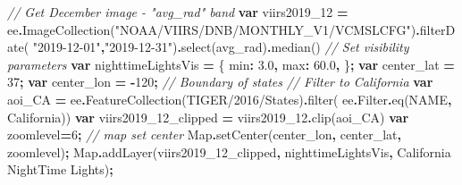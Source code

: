 \documentclass[
]{article}
\newenvironment{Shaded}{\begin{snugshade}}{\end{snugshade}}
\newcommand{\AttributeTok}[1]{\textcolor[rgb]{0.77,0.63,0.00}{#1}}
\newcommand{\BuiltInTok}[1]{#1}
\newcommand{\CommentTok}[1]{\textcolor[rgb]{0.56,0.35,0.01}{\textit{#1}}}
\newcommand{\DataTypeTok}[1]{\textcolor[rgb]{0.13,0.29,0.53}{#1}}
\newcommand{\DecValTok}[1]{\textcolor[rgb]{0.00,0.00,0.81}{#1}}
\newcommand{\FloatTok}[1]{\textcolor[rgb]{0.00,0.00,0.81}{#1}}
\newcommand{\FunctionTok}[1]{\textcolor[rgb]{0.00,0.00,0.00}{#1}}
\newcommand{\KeywordTok}[1]{\textcolor[rgb]{0.13,0.29,0.53}{\textbf{#1}}}
\newcommand{\NormalTok}[1]{#1}
\newcommand{\OperatorTok}[1]{\textcolor[rgb]{0.81,0.36,0.00}{\textbf{#1}}}
\newcommand{\StringTok}[1]{\textcolor[rgb]{0.31,0.60,0.02}{#1}}
\begin{document}
\begin{Shaded}
\begin{Highlighting}[]
\CommentTok{// Get December image {-} "avg\_rad" band}
\KeywordTok{var}\NormalTok{ viirs2019\_12 }\OperatorTok{=}\NormalTok{ ee}\OperatorTok{.}\FunctionTok{ImageCollection}\NormalTok{(}\StringTok{"NOAA/VIIRS/DNB/MONTHLY\_V1/VCMSLCFG"}\NormalTok{)}\OperatorTok{.}\FunctionTok{filterDate}\NormalTok{(}
  \StringTok{"2019{-}12{-}01"}\OperatorTok{,}\StringTok{"2019{-}12{-}31"}\NormalTok{)}\OperatorTok{.}\FunctionTok{select}\NormalTok{(}\StringTok{\textquotesingle{}avg\_rad\textquotesingle{}}\NormalTok{)}\OperatorTok{.}\FunctionTok{median}\NormalTok{()}
\CommentTok{// Set visibility parameters}
\KeywordTok{var}\NormalTok{ nighttimeLightsVis }\OperatorTok{=}\NormalTok{ \{}
  \DataTypeTok{min}\OperatorTok{:} \FloatTok{3.0}\OperatorTok{,}
  \DataTypeTok{max}\OperatorTok{:} \FloatTok{60.0}\OperatorTok{,}
\NormalTok{\}}\OperatorTok{;}
\KeywordTok{var}\NormalTok{ center\_lat }\OperatorTok{=} \DecValTok{37}\OperatorTok{;}
\KeywordTok{var}\NormalTok{ center\_lon }\OperatorTok{=} \OperatorTok{{-}}\DecValTok{120}\OperatorTok{;}
\CommentTok{// Boundary of states}
\CommentTok{// Filter to California }
\KeywordTok{var}\NormalTok{ aoi\_CA }\OperatorTok{=}\NormalTok{ ee}\OperatorTok{.}\FunctionTok{FeatureCollection}\NormalTok{(}\StringTok{\textquotesingle{}TIGER/2016/States\textquotesingle{}}\NormalTok{)}\OperatorTok{.}\FunctionTok{filter}\NormalTok{(}
\NormalTok{  ee}\OperatorTok{.}\AttributeTok{Filter}\OperatorTok{.}\FunctionTok{eq}\NormalTok{(}\StringTok{\textquotesingle{}NAME\textquotesingle{}}\OperatorTok{,} \StringTok{\textquotesingle{}California\textquotesingle{}}\NormalTok{))}
\KeywordTok{var}\NormalTok{ viirs2019\_12\_clipped }\OperatorTok{=}\NormalTok{ viirs2019\_12}\OperatorTok{.}\FunctionTok{clip}\NormalTok{(aoi\_CA)}
\KeywordTok{var}\NormalTok{ zoomlevel}\OperatorTok{=}\DecValTok{6}\OperatorTok{;}
\CommentTok{// map set center }
\BuiltInTok{Map}\OperatorTok{.}\FunctionTok{setCenter}\NormalTok{(center\_lon}\OperatorTok{,}\NormalTok{ center\_lat}\OperatorTok{,}\NormalTok{ zoomlevel)}\OperatorTok{;}
\BuiltInTok{Map}\OperatorTok{.}\FunctionTok{addLayer}\NormalTok{(viirs2019\_12\_clipped}\OperatorTok{,}\NormalTok{ nighttimeLightsVis}\OperatorTok{,} \StringTok{\textquotesingle{}California NightTime Lights\textquotesingle{}}\NormalTok{)}\OperatorTok{;} 
\end{Highlighting}
\end{Shaded}
\end{document}
